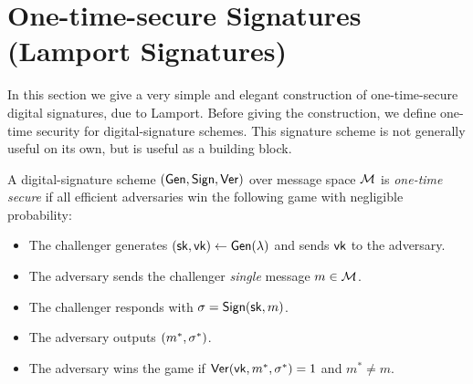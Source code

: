 \section{One-time-secure Signatures (Lamport Signatures)}

In this section we give a very simple and elegant construction 
of one-time-secure digital signatures, due to Lamport.\cite{L79}
Before giving the construction, we define one-time security for 
digital-signature schemes.
This signature scheme is not generally useful on its own, but is
useful as a building block.

\begin{definition}\label{def:sig-once}
A digital-signature scheme $(\mathsf{Gen}, \mathsf{Sign}, \mathsf{Ver})$ over message space $\mathcal{M}$ is \emph{one-time secure} if all efficient adversaries win
the following game with negligible probability:
  \begin{itemize}[noitemsep]
    \item The challenger generates $({\mathsf{sk}}, \mathsf{vk}) \leftarrow \mathsf{Gen}(\lambda)$ and sends $\mathsf{vk}$ to the adversary.
    \item The adversary sends the challenger \emph{single} message $m \in \mathcal{M}$.
    \item The challenger responds with $\sigma = \mathsf{Sign}({\mathsf{sk}}, m)$.
    \item The adversary outputs $(m^*, \sigma^*)$.
    \item The adversary wins the game if $\mathsf{Ver}(\mathsf{vk}, m^*, \sigma^*) = 1$ and $m^* \neq m$.
\end{itemize}
\end{definition}

